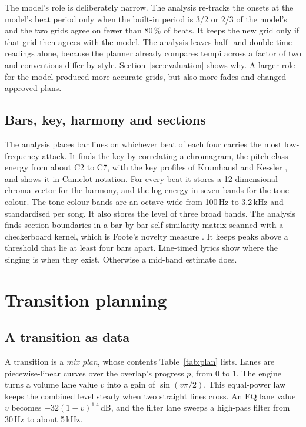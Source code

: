 \documentclass[conference,a4paper]{IEEEtran}
\begin{document}
The model's role is deliberately narrow. The analysis re-tracks the onsets at the model's beat
period only when the built-in period is 3/2 or 2/3 of the model's and the two grids agree on fewer
than 80\,\% of beats. It keeps the new grid only if that grid then agrees with the model. The
analysis leaves half- and double-time readings alone, because the planner already compares tempi
across a factor of two and conventions differ by style. Section~\ref{sec:evaluation} shows why. A
larger role for the model produced more accurate grids, but also more fades and changed approved
plans.

\subsection{Bars, key, harmony and sections}
The analysis places bar lines on whichever beat of each four carries the most low-frequency
attack. It finds the key by correlating a chromagram, the pitch-class energy from about C2 to C7,
with the key profiles of Krumhansl and Kessler \cite{krumhansl1982}, and shows it in Camelot notation.
For every beat it stores a 12-dimensional chroma vector for the harmony, and the log energy in
seven bands for the tone colour. The tone-colour bands are an octave wide from 100\,Hz to
3.2\,kHz and standardised per song. It also stores the level of three broad bands. The analysis
finds section boundaries in a bar-by-bar self-similarity matrix scanned with a checkerboard kernel,
which is Foote's novelty measure \cite{foote2000}. It keeps peaks above a threshold that lie at
least four bars apart. Line-timed lyrics show where the singing is when they exist. Otherwise a
mid-band estimate does.

\section{Transition planning}\label{sec:planning}

\subsection{A transition as data}
A transition is a \emph{mix plan}, whose contents Table~\ref{tab:plan} lists. Lanes are
piecewise-linear curves over the overlap's progress $p$, from 0 to 1. The engine turns a volume lane
value $v$ into a gain of $\sin(v\pi/2)$. This equal-power law keeps the combined level steady when
two straight lines cross. An EQ lane value $v$ becomes $-32(1-v)^{1.4}$\,dB, and the filter lane
sweeps a high-pass filter from 30\,Hz to about 5\,kHz.
\end{document}
